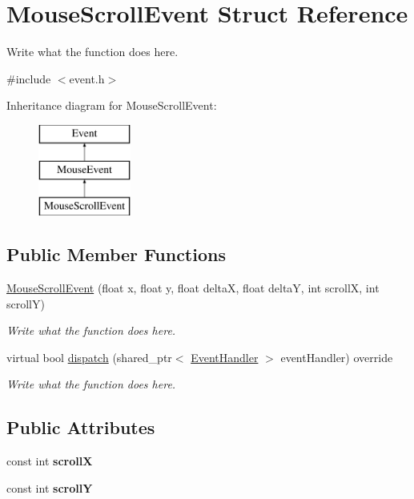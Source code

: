 \hypertarget{structMouseScrollEvent}{\section{Mouse\+Scroll\+Event Struct Reference}
\label{structMouseScrollEvent}
}


Write what the function does here.  




{\ttfamily \#include $<$event.\+h$>$}

Inheritance diagram for Mouse\+Scroll\+Event\+:\begin{figure}[H]
\begin{center}
\leavevmode
\includegraphics[height=3.000000cm]{structMouseScrollEvent}
\end{center}
\end{figure}
\subsection*{Public Member Functions}
\begin{DoxyCompactItemize}
\item 
\hyperlink{structMouseScrollEvent_a7fffc52d48bef83bcf2aea47734c3fca}{Mouse\+Scroll\+Event} (float x, float y, float delta\+X, float delta\+Y, int scroll\+X, int scroll\+Y)
\begin{DoxyCompactList}\small\item\em Write what the function does here. \end{DoxyCompactList}\item 
virtual bool \hyperlink{structMouseScrollEvent_acaa9673a50db8c33dd1cdbf1c5da2816}{dispatch} (shared\+\_\+ptr$<$ \hyperlink{structEventHandler}{Event\+Handler} $>$ event\+Handler) override
\begin{DoxyCompactList}\small\item\em Write what the function does here. \end{DoxyCompactList}\end{DoxyCompactItemize}
\subsection*{Public Attributes}
\begin{DoxyCompactItemize}
\item 
\hypertarget{structMouseScrollEvent_aed934d011f9c2fd1cd63f1b53bec598d}{const int {\bfseries scroll\+X}}\label{structMouseScrollEvent_aed934d011f9c2fd1cd63f1b53bec598d}

\item 
\hypertarget{structMouseScrollEvent_aefa811ca1ad2b3ef22c4423241e3ae40}{const int {\bfseries scroll\+Y}}\label{structMouseScrollEvent_aefa811ca1ad2b3ef22c4423241e3ae40}

\end{DoxyCompactItemize}
